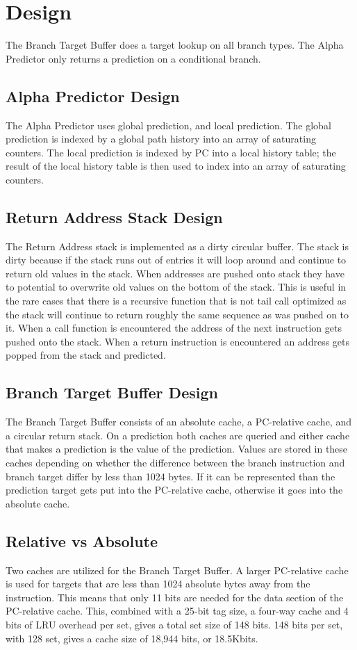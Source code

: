 \section{Design}
The Branch Target Buffer does a target lookup on all branch types. The Alpha Predictor only returns a prediction on a conditional branch.

\subsection{Alpha Predictor Design}
The Alpha Predictor uses global prediction, and local prediction. The global prediction is indexed by a global path history into an array of saturating counters. The local prediction is indexed by PC into a local history table; the result of the local history table is then used to index into an array of saturating counters.

\subsection{Return Address Stack Design}
The Return Address stack is implemented as a dirty circular buffer. The stack is dirty because if the stack runs out of entries it will loop around and continue to return old values in the stack. When addresses are pushed onto stack they have to potential to overwrite old values on the bottom of the stack. This is useful in the rare cases that there is a recursive function that is not tail call optimized as the stack will continue to return roughly the same sequence as was pushed on to it. When a call function is encountered the address of the next instruction gets pushed onto the stack. When a return instruction is encountered an address gets popped from the stack and predicted.

\subsection{Branch Target Buffer Design}
The Branch Target Buffer consists of an absolute cache, a PC-relative cache, and a circular return stack. On a prediction both caches are queried and either cache that makes a prediction is the value of the prediction. Values are stored in these caches depending on whether the difference between the branch instruction and branch target differ by less than 1024 bytes. If it can be represented than the prediction target gets put into the PC-relative cache, otherwise it goes into the absolute cache. 

\subsection{Relative vs Absolute}
Two caches are utilized for the Branch Target Buffer. A larger PC-relative cache is used for targets that are less than 1024 absolute bytes away from the instruction. This means that only 11 bits are needed for the data section of the PC-relative cache. This, combined with a 25-bit tag size, a four-way cache and 4 bits of LRU overhead per set, gives a total set size of 148 bits. 148 bits per set, with 128 set, gives a cache size of 18,944 bits, or 18.5Kbits.

